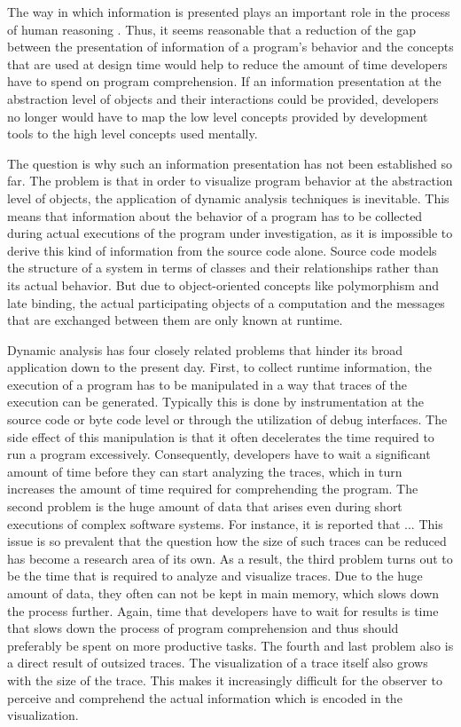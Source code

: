 The way in which information is presented plays an important role in the process of human reasoning \cite{diehl_software_2007}.
Thus, it seems reasonable that a reduction of the gap between the presentation of information of a program's behavior and the concepts that are used at design time would help to reduce the amount of time developers have to spend on program comprehension.
If an information presentation at the abstraction level of objects and their interactions could be provided, developers no longer would have to map the low level concepts provided by development tools to the high level concepts used mentally.

The question is why such an information presentation has not been established so far.
The problem is that in order to visualize program behavior at the abstraction level of objects, the application of dynamic analysis techniques is inevitable.
This means that information about the behavior of a program has to be collected during actual executions of the program under investigation, as it is impossible to derive this kind of information from the source code alone.
Source code models the structure of a system in terms of classes and their relationships rather than its actual behavior.
But due to object-oriented concepts like polymorphism and late binding, the actual participating objects of a computation and the messages that are exchanged between them are only known at runtime.

Dynamic analysis has four closely related problems that hinder its broad application down to the present day.
First, to collect runtime information, the execution of a program has to be manipulated in a way that traces of the execution can be generated.
Typically this is done by instrumentation at the source code or byte code level or through the utilization of debug interfaces.
The side effect of this manipulation is that it often decelerates the time required to run a program excessively.
Consequently, developers have to wait a significant amount of time before they can start analyzing the traces, which in turn increases the amount of time required for comprehending the program.
The second problem is the huge amount of data that arises even during short executions of complex software systems.
For instance, it is reported that ...
This issue is so prevalent that the question how the size of such traces can be reduced  has become a research area of its own.
As a result, the third problem turns out to be the time that is required to analyze and visualize traces.
Due to the huge amount of data, they often can not be kept in main memory, which slows down the process further.
Again, time that developers have to wait for results is time that slows down the process of program comprehension and thus should preferably be spent on more productive tasks.
The fourth and last problem also is a direct result of outsized traces.
The visualization of a trace itself also grows with the size of the trace.
This makes it increasingly difficult for the observer to perceive and comprehend the actual information which is encoded in the visualization.

